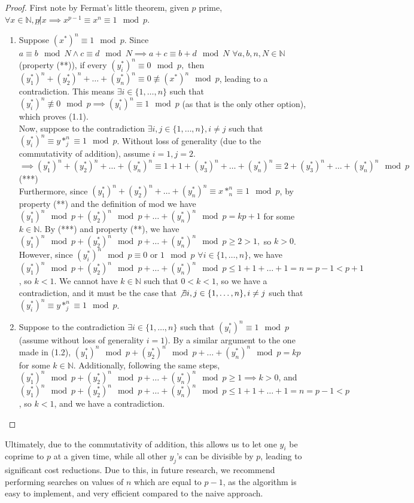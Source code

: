 \documentclass{article}
\begin{document}
\begin{flushleft}
\begin{proof}
    First note by Fermat's little theorem, given $p$ prime, $\forall x \in \mathbb{N}, p \not| x \implies x^{p - 1} \equiv x^n \equiv 1 \mod p$.
    \begin{enumerate}
        \item Suppose $(x^*)^n \equiv 1 \mod p$. Since $a \equiv b \mod N \land c \equiv d \mod N \implies a + c \equiv b + d \mod N$ $\forall a, b, n, N \in \mathbb{N}$ (property (**)), if every $(y^*_i)^n \equiv 0 \mod p,$ then $(y^*_1)^n + (y^*_2)^n + \ldots + (y^*_n)^n \equiv 0 \not\equiv (x^*)^n \mod p$, leading to a contradiction. This means $\exists i \in \{1, \ldots, n\}$ such that $(y^*_i)^n \not\equiv 0 \mod p \implies (y^*_i)^n \equiv 1 \mod p$ (as that is the only other option), which proves (1.1). \\
        Now, suppose to the contradiction $\exists i, j \in \{1, \ldots, n\}, i \neq j$ such that $(y^*_i)^n \equiv y*_j^n \equiv 1 \mod p$. Without loss of generality (due to the commutativity of addition), assume $i = 1, j = 2$. \\
        $\implies (y^*_1)^n + (y^*_2)^n + \ldots + (y^*_n)^n \equiv 1 + 1 + (y^*_3)^n + \ldots + (y^*_n)^n \equiv 2 + (y^*_3)^n + \ldots + (y^*_n)^n \mod p$ (***) \\
        Furthermore, since $(y^*_1)^n + (y^*_2)^n + \ldots + (y^*_n)^n \equiv x*_n^n \equiv 1 \mod p$, by property (**) and the definition of mod we have $(y^*_1)^n \mod p + (y^*_2)^n \mod p + \ldots + (y^*_n)^n \mod p = kp+1$ for some $k \in \mathbb{N}$. By (***) and property (**), we have $(y^*_1)^n \mod p + (y^*_2)^n \mod p + \ldots + (y^*_n)^n \mod p \geq 2 > 1,$ so $k > 0$. However, since $(y^*_i)^n \mod p \equiv 0$ or $1 \mod p$ $\forall i \in \{1, \ldots, n\}$, we have $(y^*_1)^n \mod p + (y^*_2)^n \mod p + \ldots + (y^*_n)^n \mod p \leq 1 + 1 + \ldots + 1 = n = p - 1 < p + 1$, so $k < 1$. We cannot have $k \in \mathbb{N}$ such that $0 < k < 1$, so we have a contradiction, and it must be the case that $\not\exists i, j \in \{1, \ldots, n\}, i \neq j$ such that $(y^*_i)^n \equiv y*_j^n \equiv 1 \mod p$.
        \item Suppose to the contradiction $\exists i \in \{1, \ldots, n\}$ such that $(y^*_i)^n \equiv 1 \mod p$ (assume without loss of generality $i = 1$). By a similar argument to the one made in (1.2), $(y^*_1)^n \mod p + (y^*_2)^n \mod p + \ldots + (y^*_n)^n \mod p = kp$ for some $k \in \mathbb{N}$. Additionally, following the same steps, $(y^*_1)^n \mod p + (y^*_2)^n \mod p + \ldots + (y^*_n)^n \mod p \geq 1 \implies k > 0$, and $(y^*_1)^n \mod p + (y^*_2)^n \mod p + \ldots + (y^*_n)^n \mod p \leq 1 + 1 + \ldots + 1 = n = p - 1 < p$, so $k < 1$, and we have a contradiction.
    \end{enumerate}        
\end{proof}
Ultimately, due to the commutativity of addition, this allows us to let one $y_i$ be coprime to $p$ at a given time, while all other $y_j$'s can be divisible by $p$, leading to significant cost reductions. Due to this, in future research, we recommend performing searches on values of $n$ which are equal to $p - 1$, as the algorithm is easy to implement, and very efficient compared to the naive approach.


\end{flushleft}
\end{document}
